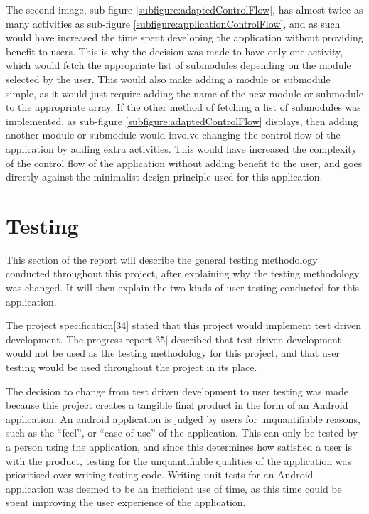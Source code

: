 \documentclass{article}
\begin{document}
The second image, sub-figure \ref{subfigure:adaptedControlFlow}, has almost twice as many activities as sub-figure \ref{subfigure:applicationControlFlow}, and as such would have increased the time spent developing the application without providing benefit to users. This is why the decision was made to have only one activity, which would fetch the appropriate list of submodules depending on the module selected by the user. This would also make adding a module or submodule simple, as it would just require adding the name of the new module or submodule to the appropriate array. If the other method of fetching a list of submodules was implemented, as sub-figure \ref{subfigure:adaptedControlFlow} displays, then adding another module or submodule would involve changing the control flow of the application by adding extra activities. This would have increased the complexity of the control flow of the application without adding benefit to the user, and goes directly against the minimalist design principle used for this application. \par


\section{Testing}
\label{section:testing}

This section of the report will describe the general testing methodology conducted throughout this project, after explaining why the testing methodology was changed. It will then explain the two kinds of user testing conducted for this application. \par 

The project specification[34] stated that this project would implement test driven development. The progress report[35] described that test driven development would not be used as the testing methodology for this project, and that user testing would be used throughout the project in its place. \par

The decision to change from test driven development to user testing was made because this project creates a tangible final product in the form of an Android application. An android application is judged by users for unquantifiable reasons, such as the ``feel'', or ``ease of use'' of the application. This can only be tested by a person using the application, and since this determines how satisfied a user is with the product, testing for the unquantifiable qualities of the application was prioritised over writing testing code. Writing unit tests for an Android application was deemed to be an inefficient use of time, as this time could be spent improving the user experience of the application. \par
\end{document}
